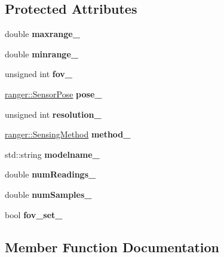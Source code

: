 \subsection*{Protected Attributes}
\begin{DoxyCompactItemize}
\item 
\mbox{\label{classRanger_a63dd9ac2ff81dc57ad9bf36d16f1da31}} 
double {\bfseries maxrange\+\_\+}
\item 
\mbox{\label{classRanger_a934b3e696fdb5ca2251eb4c9e7f8540d}} 
double {\bfseries minrange\+\_\+}
\item 
\mbox{\label{classRanger_a013937201e2a4a516d4d36cac0193d68}} 
unsigned int {\bfseries fov\+\_\+}
\item 
\mbox{\label{classRanger_a92c38c7725afb93aa247b3d5ea3989ef}} 
\hyperlink{structranger_1_1SensorPose}{ranger\+::\+Sensor\+Pose} {\bfseries pose\+\_\+}
\item 
\mbox{\label{classRanger_a9ccefbbcacf126ac6485ae26ff550092}} 
unsigned int {\bfseries resolution\+\_\+}
\item 
\mbox{\label{classRanger_a0fb0340a9d148fd0d1b63c600b81ec36}} 
\hyperlink{namespaceranger_ab04465c229cc50595ffe40a891a3b135}{ranger\+::\+Sensing\+Method} {\bfseries method\+\_\+}
\item 
\mbox{\label{classRanger_aada686d9a39d7899cd2dcae857c32ee4}} 
std\+::string {\bfseries modelname\+\_\+}
\item 
\mbox{\label{classRanger_a4912a54c69e4b2bf667e4b83f17414e3}} 
double {\bfseries num\+Readings\+\_\+}
\item 
\mbox{\label{classRanger_a8b6dc0103ba424ff3c607d47b24077b8}} 
double {\bfseries num\+Samples\+\_\+}
\item 
\mbox{\label{classRanger_a733a8974ad082a7bedacd346c0f42d26}} 
bool {\bfseries fov\+\_\+set\+\_\+}
\end{DoxyCompactItemize}


\subsection{Member Function Documentation}
\mbox{\label{classRanger_a2b76dc3e21da8a7abac830d09fa81241}} 
